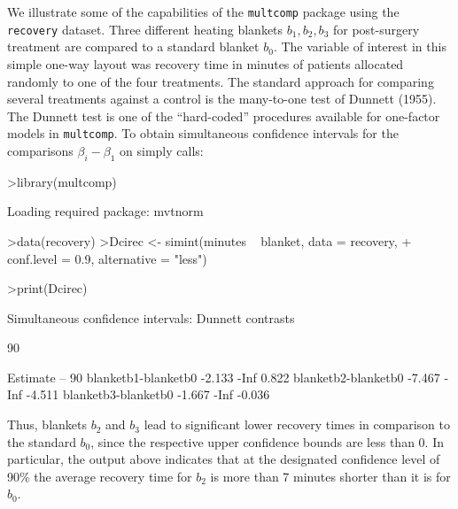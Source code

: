 \documentclass{article}
\begin{document}
We illustrate some of the capabilities of the \texttt{multcomp}
package using the \texttt{recovery} dataset. Three
different heating blankets $b_1, b_2, b_3$ for post-surgery
treatment are compared to a standard blanket $b_0$. The variable
of interest in this simple one-way layout was recovery time in
minutes of patients allocated randomly to one of the four
treatments. The standard approach for comparing several treatments
against a control is the many-to-one test of Dunnett (1955). The
Dunnett test is one of the ``hard-coded'' procedures available for
one-factor models in \texttt{multcomp}. To obtain simultaneous
confidence intervals for the comparisons $\beta_i - \beta_1$ on
simply calls:
\small
\begin{Schunk}
\begin{Sinput}
>library(multcomp)
\end{Sinput}
\begin{Soutput}
Loading required package: mvtnorm 
\end{Soutput}
\begin{Sinput}
>data(recovery)
>Dcirec <- simint(minutes ~ blanket, data = recovery, 
+     conf.level = 0.9, alternative = "less")
\end{Sinput}
\end{Schunk}
\begin{Schunk}
\begin{Sinput}
>print(Dcirec)
\end{Sinput}
\begin{Soutput}
	Simultaneous confidence intervals: Dunnett
	contrasts

	90 % confidence intervals

                    Estimate   --   90 %
blanketb1-blanketb0   -2.133 -Inf  0.822
blanketb2-blanketb0   -7.467 -Inf -4.511
blanketb3-blanketb0   -1.667 -Inf -0.036
\end{Soutput}
\end{Schunk}
\normalsize
Thus, blankets $b_2$ and $b_3$ lead to significant lower recovery
times in comparison to the standard $b_0$, since the respective
upper confidence bounds are less than 0. In particular, the output
above indicates that at the designated confidence level of 90\%
the average recovery time for $b_2$ is more than 7 minutes shorter
than it is for $b_0$.
\end{document}
